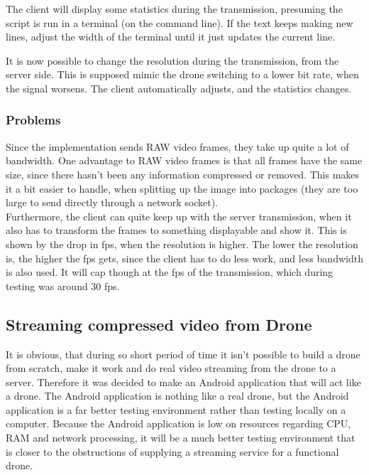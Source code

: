The client will display some statistics during the transmission, presuming the script is run in a terminal (on the command line). If the text keeps making new lines, adjust the width of the terminal until it just updates the current line.

It is now possible to change the resolution during the transmission, from the server side. This is supposed mimic the drone switching to a lower bit rate, when the signal worsens. The client automatically adjusts, and the statistics changes.\\


\subsubsection{Problems}
Since the implementation sends RAW video frames, they take up quite a lot of bandwidth. One advantage to RAW video frames is that all frames have the same size, since there hasn't been any information compressed or removed. This makes it a bit easier to handle, when splitting up the image into packages (they are too large to send directly through a network socket).\\

Furthermore, the client can quite keep up with the server transmission, when it also has to transform the frames to something displayable and show it. This is shown by the drop in fps, when the resolution is higher. The lower the resolution is, the higher the fps gets, since the client has to do less work, and less bandwidth is also used. It will cap though at the fps of the transmission, which during testing was around 30 fps.

\subsection{Streaming compressed video from Drone}
It is obvious, that during so short period of time it isn't possible to build a drone from scratch, make it work and do real video streaming from the drone to a server. Therefore it was decided to make an Android application that will act like a drone. The Android application is nothing like a real drone, but the Android application is a far better testing environment rather than testing locally on a computer. Because the Android application is low on resources regarding CPU, RAM and network processing, it will be a much better testing environment that is closer to the obstructions of supplying a streaming service for a functional drone.

